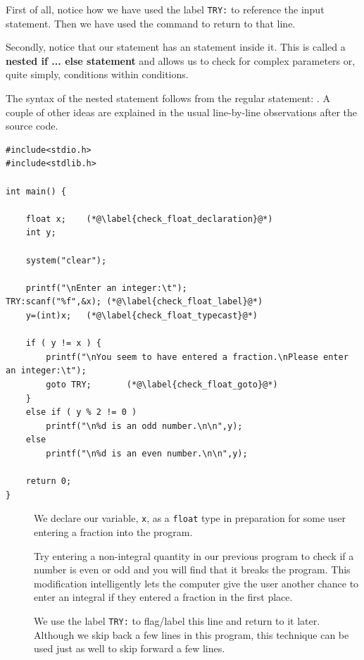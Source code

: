 \documentclass[11pt,oneside]{article}
\begin{document}
{{{{{{{{{First of all, notice how we have used the label \verb+TRY:+ to reference the input statement. Then we have used the  command to return to that line.

Secondly, notice that our  statement has an  statement inside it. This is called a \textbf{nested if ... else statement} and allows us to check for complex parameters or, quite simply, conditions within conditions.

The syntax of the nested  statement follows from the regular  statement: . A couple of other ideas are explained in the usual line-by-line observations after the source code.\\

\begin{lstlisting}
#include<stdio.h>
#include<stdlib.h>

int main() {
    
    float x;	(*@\label{check_float_declaration}@*)
    int y;
    
    system("clear");
    
    printf("\nEnter an integer:\t");
TRY:scanf("%f",&x);	(*@\label{check_float_label}@*)
    y=(int)x;	(*@\label{check_float_typecast}@*)
    
    if ( y != x ) {	
        printf("\nYou seem to have entered a fraction.\nPlease enter an integer:\t");
        goto TRY;		(*@\label{check_float_goto}@*)
    }
    else if ( y % 2 != 0 )
        printf("\n%d is an odd number.\n\n",y);
    else
        printf("\n%d is an even number.\n\n",y);
    
    return 0;
}
\end{lstlisting}
\begin{description}
\item[] We declare our variable, \verb+x+, as a \verb+float+ type in preparation for some user entering a fraction into the program.

Try entering a non-integral quantity in our previous program to check if a number is even or odd and you will find that it breaks the program. This modification intelligently lets the computer give the user another chance to enter an integral if they entered a fraction in the first place.

\item[] We use the label \verb+TRY:+ to flag/label this line and return to it later. Although we skip back a few lines in this program, this technique can be used just as well to skip forward a few lines.


\end{description}}}}}}}}}}
\end{document}
